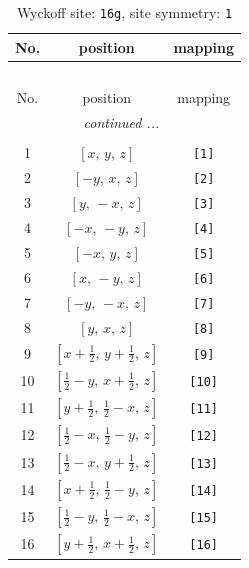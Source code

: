 \documentclass[fleqn,8pt]{jsarticle}
\begin{document}
\begin{longtable}{ccc}
\caption{Wyckoff site: {\tt 16g}, site symmetry: {\tt 1}}
 \\
 \hline \hline
No. & position & mapping \\ \hline \endfirsthead

\multicolumn{2}{l}{\tablename\ \thetable{}} \\
 \hline \hline
No. & position & mapping \\ \hline \endhead

 \hline \hline
\multicolumn{2}{r}{\footnotesize\it continued ...} \\ \endfoot

 \hline \hline
\multicolumn{2}{r}{} \\ \endlastfoot

1 & $\left[ x,\, y,\, z \right]$ & {\tt [1]} \\ \hline
2 & $\left[ - y,\, x,\, z \right]$ & {\tt [2]} \\ \hline
3 & $\left[ y,\, - x,\, z \right]$ & {\tt [3]} \\ \hline
4 & $\left[ - x,\, - y,\, z \right]$ & {\tt [4]} \\ \hline
5 & $\left[ - x,\, y,\, z \right]$ & {\tt [5]} \\ \hline
6 & $\left[ x,\, - y,\, z \right]$ & {\tt [6]} \\ \hline
7 & $\left[ - y,\, - x,\, z \right]$ & {\tt [7]} \\ \hline
8 & $\left[ y,\, x,\, z \right]$ & {\tt [8]} \\ \hline
9 & $\left[ x + \frac{1}{2},\, y + \frac{1}{2},\, z \right]$ & {\tt [9]} \\ \hline
10 & $\left[ \frac{1}{2} - y,\, x + \frac{1}{2},\, z \right]$ & {\tt [10]} \\ \hline
11 & $\left[ y + \frac{1}{2},\, \frac{1}{2} - x,\, z \right]$ & {\tt [11]} \\ \hline
12 & $\left[ \frac{1}{2} - x,\, \frac{1}{2} - y,\, z \right]$ & {\tt [12]} \\ \hline
13 & $\left[ \frac{1}{2} - x,\, y + \frac{1}{2},\, z \right]$ & {\tt [13]} \\ \hline
14 & $\left[ x + \frac{1}{2},\, \frac{1}{2} - y,\, z \right]$ & {\tt [14]} \\ \hline
15 & $\left[ \frac{1}{2} - y,\, \frac{1}{2} - x,\, z \right]$ & {\tt [15]} \\ \hline
16 & $\left[ y + \frac{1}{2},\, x + \frac{1}{2},\, z \right]$ & {\tt [16]} \\
\end{longtable}
\end{document}
